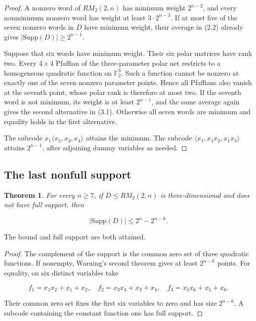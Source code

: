 \documentclass[11pt]{article}
\newtheorem{theorem}{Theorem}[section]
\theoremstyle{remark}
\numberwithin{equation}{section}
\begin{document}
\begin{proof}
A nonzero word of \(RM_2(2,n)\) has minimum weight \(2^{n-2}\), and
every nonminimum nonzero word has weight at least \(3\cdot2^{n-3}\). If at most
five of the seven nonzero words in \(D\) have minimum weight, their average in
(2.2) already gives \(|\mathrm{Supp}(D)|\ge2^{n-1}\).

Suppose that six words have minimum weight. Their six polar matrices have rank
two. Every \(4\times4\) Pfaffian of the three-parameter polar net restricts to a
homogeneous quadratic function on \(\mathbb F_2^3\). Such a function cannot be
nonzero at exactly one of the seven nonzero parameter points. Hence all
Pfaffians also vanish at the seventh point, whose polar rank is therefore at
most two. If the seventh word is not minimum, its weight is at least
\(2^{n-1}\), and the same average again gives the second alternative in (3.1).
Otherwise all seven words are minimum and equality holds in the first
alternative.

The subcode \(x_1\langle x_2,x_3,x_4\rangle\) attains the minimum. The subcode
\(\langle x_1,x_1x_2,x_1x_3\rangle\) attains \(2^{n-1}\), after adjoining dummy
variables as needed.
\end{proof}


\subsection{The last nonfull support}


\Needspace{0.23\textheight}
\begin{theorem}
For every \(n\ge7\), if
\(D\le RM_2(2,n)\) is three-dimensional and does not have full support, then
\end{theorem}


\[
|\mathrm{Supp}(D)|\le2^n-2^{n-6}.               \tag{3.2}
\]

The bound and full support are both attained.

\begin{proof}
The complement of the support is the common zero set of three
quadratic functions. If nonempty, Warning's second theorem gives at least
\(2^{n-6}\) points. For equality, on six distinct variables take

\[
f_1=x_1x_2+x_1+x_2,\quad
f_2=x_3x_4+x_3+x_4,\quad
f_3=x_5x_6+x_5+x_6.
\]

Their common zero set fixes the first six variables to zero and has size
\(2^{n-6}\). A subcode containing the constant function one has full support.
\end{proof}
\end{document}
